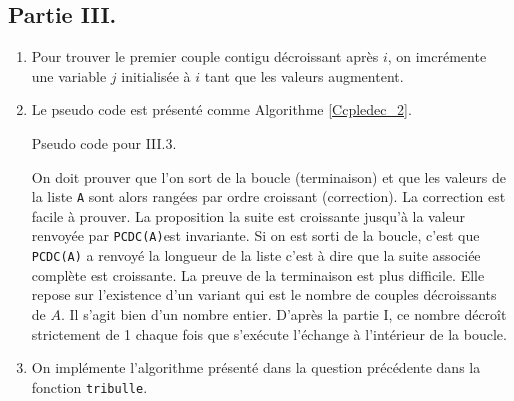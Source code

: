 \subsection*{Partie III.}
\begin{enumerate}
  \item Pour trouver le premier couple contigu décroissant après $i$, on imcrémente une variable $j$ initialisée à $i$ tant que les valeurs augmentent.

  \item Le pseudo code est présenté comme Algorithme \ref{Ccpledec_2}.\newline
\begin{algorithm}
  \caption{Pseudo code pour III.3.}
  \label{Ccpledec_2}
\end{algorithm}
On doit prouver que l'on sort de la boucle (terminaison) et que les valeurs de la liste \texttt{A} sont alors rangées par ordre croissant (correction).\newline
La correction est facile à prouver. La proposition \og la suite est croissante jusqu'à la valeur renvoyée par \texttt{PCDC(A)}\fg est invariante. Si on est sorti de la boucle, c'est que \texttt{PCDC(A)} a renvoyé la longueur de la liste c'est à dire que la suite associée complète est croissante. \newline
La preuve de la terminaison est plus difficile. Elle repose sur l'existence d'un variant qui est le nombre de couples décroissants de $A$. Il s'agit bien d'un nombre entier. D'après la partie I, ce nombre décroît strictement de 1 chaque fois que s'exécute l'échange à l'intérieur de la boucle. 

  \item On implémente l'algorithme présenté dans la question précédente dans la fonction \texttt{tribulle}.

\end{enumerate}

